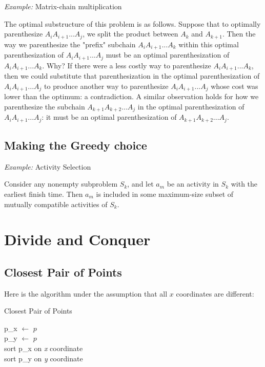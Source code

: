 \documentclass[a4paper, 12pt]{article}
\begin{document}
\textit{Example:} Matrix-chain multiplication

The optimal substructure of this problem is as follows. Suppose that to optimally parenthesize $A_iA_{i+1}...A_j$, we split the product between $A_k$ and $A_{k+1}$. Then the way we parenthesize the "prefix" subchain $A_iA_{i+1}...A_k$ within this optimal parenthesization of $A_iA_{i+1}...A_j$ must be an optimal parenthesization of $A_iA_{i+1}...A_k$. Why? If there were a less costly way to parenthesize $A_iA_{i+1}...A_k$, then we could substitute that parenthesization in the optimal parenthesization of $A_iA_{i+1}...A_j$ to produce another way to parenthesize $A_iA_{i+1}...A_j$ whose cost was lower than the optimum: a contradiction. A similar observation holds for how we parenthesize the subchain $A_{k+1}A_{k+2}...A_j$ in the optimal parenthesization of $A_iA_{i+1}...A_j$: it must be an optimal parenthesization of $A_{k+1}A_{k+2}...A_j$.

  \subsection{Making the Greedy choice}

\textit{Example:} Activity Selection

Consider any nonempty subproblem $S_k$, and let $a_m$ be an activity in $S_k$ with the earliest finish time. Then $a_m$ is included in some maximum-size subset of mutually compatible activities of $S_k$.

\section{Divide and Conquer}

  \subsection{Closest Pair of Points}

Here is the algorithm under the assumption that all $x$ coordinates are different:

\vspace{0.5cm}

\IncMargin{2em}
\begin{algorithm}[H]
\caption{Closest Pair of Points}
\vspace{0.1cm}
\Indm
{}
\Indp
\vspace{0.1cm}
p\_x $\gets$ $p$\\
p\_y $\gets$ $p$\\
sort p\_x on \textit{x} coordinate\\
sort p\_y on \textit{y} coordinate\\
  \KwRet {}
\end{algorithm}
\DecMargin{2em}
\end{document}
